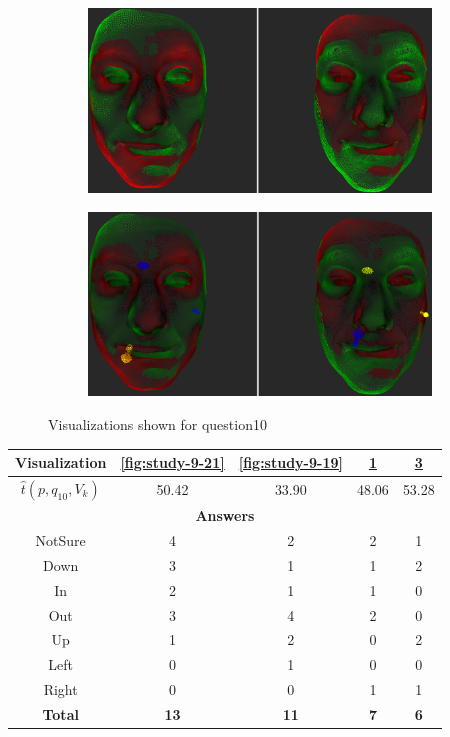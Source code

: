 \begin{figure}[h]
\begin{subfigure}{0.4\textwidth}
\includegraphics[width=\textwidth]{./screenshots/pair20.PNG}
\caption{}
\label{fig:study-9-20}
\end{subfigure}
\quad
\begin{subfigure}{0.4\textwidth}
\includegraphics[width=\textwidth]{./screenshots/pair24.PNG}
\caption{}
\label{fig:study-9-24}
\end{subfigure}
\caption{Visualizations shown for question10}
\end{figure}
\medskip

\begin{center}
\begin{tabular}{| c | c | c | c | c |}
	\hline
	Visualization & \ref{fig:study-9-21} & \ref{fig:study-9-19} & \ref{fig:study-9-20} & \ref{fig:study-9-24}\\ \hline
	\(\widehat{t}(p, q_10, V_k)\) & 50.42 & 33.90 & 48.06 & 53.28\\ \hline
	\multicolumn{5}{|c|}{\bf Answers} \\ \hline
	NotSure & 4 & 2 & 2 & 1\\ \hline
	Down & 3 & 1 & 1 & 2\\ \hline
	In & 2 & 1 & 1 & 0\\ \hline
	Out & 3 & 4 & 2 & 0\\ \hline
	Up & 1 & 2 & 0 & 2\\ \hline
	Left & 0 & 1 & 0 & 0\\ \hline
	Right & 0 & 0 & 1 & 1\\ \hline
	{\bf Total} & {\bf 13} & {\bf 11} & {\bf 7} & {\bf 6}\\ \hline
\end{tabular}
\end{center}
\clearpage

